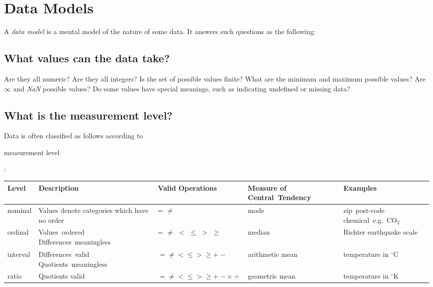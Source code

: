     \section{Data Models}

  \par A 
  \textit{data model} is a mental model of the nature of some data. It
  answers such questions as the following:
  \subsection{What values can the data take?}
Are they all numeric? Are they
  all integers? Is the set of possible values finite? What are the
  minimum and maximum possible values? Are $\infty$ and 
  \textit{NaN} possible values? Do some values have special meanings,
  such as indicating undefined or missing data?
  \subsection{What is the measurement level?}

  \par Data is often classified as follows according to 
  \begin{i}measurement level\end{i}:
  \begin{center}
    \begin{tabular}{|l||p{40 mm}|p{20 mm}|p{20 mm}|p{30 mm}|}
    \hline 
      \textbf{Level} & 
      \textbf{Description} & 
      \textbf{Valid \mbox{Operations}} & 
      \textbf{Measure of Central\ Tendency} & 
      \textbf{Examples}
    \\
    \hline 
    \hline 
      nominal & 
      Values denote categories which have no order & 
      = $\neq$ & 
      mode & 
      \mbox{zip post-code} \mbox{chemical e.g. CO$_{2}$}
    \\
    \hline 
      ordinal & 
      \mbox{Values ordered} \mbox{Differences meaningless} & 
      = $\neq$ $<$ $\le$ $>$ $\ge$ & 
      median & 
      Richter earthquake scale
    \\
    \hline 
      interval & 
      \mbox{Differences valid} \mbox{Quotients meaningless} & 
      $= \neq < \le > \ge + -$ & 
      arithmetic mean & 
      temperature in $^{\circ}$C
    \\
    \hline 
      ratio & 
      Quotients valid & 
      $= \neq < \le > \ge + - \times \div $ & 
      geometric mean & 
      temperature in $^{\circ}$K 
    \\
  \hline
\end{tabular} \\ \par
  \end{center}

